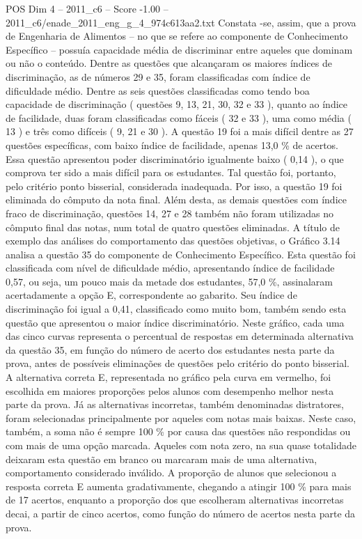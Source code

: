\begin{textsample}{POS Dim 4 – 2011\_c6 – Score -1.00 – 2011\_c6/enade\_2011\_eng\_g\_4\_974c613aa2.txt}
Constata -se, assim, que a prova de Engenharia de Alimentos – no que se refere ao componente de Conhecimento Específico – possuía capacidade média de discriminar entre aqueles que dominam ou não o conteúdo.
Dentre as questões que alcançaram os maiores índices de discriminação, as de números 29 e 35, foram classificadas com índice de dificuldade médio.
Dentre as seis questões classificadas como tendo boa capacidade de discriminação ( questões 9, 13, 21, 30, 32 e 33 ), quanto ao índice de facilidade, duas foram classificadas como fáceis ( 32 e 33 ), uma como média ( 13 ) e três como difíceis ( 9, 21 e 30 ).
A questão 19 foi a mais difícil dentre as 27 questões específicas, com baixo índice de facilidade, apenas 13,0 \% de acertos.
Essa questão apresentou poder discriminatório igualmente baixo ( 0,14 ), o que comprova ter sido a mais difícil para os estudantes.
Tal questão foi, portanto, pelo critério ponto bisserial, considerada inadequada.
Por isso, a questão 19 foi eliminada do cômputo da nota final.
Além desta, as demais questões com índice fraco de discriminação, questões 14, 27 e 28 também não foram utilizadas no cômputo final das notas, num total de quatro questões eliminadas.
A título de exemplo das análises do comportamento das questões objetivas, o Gráfico 3.14 analisa a questão 35 do componente de Conhecimento Específico.
Esta questão foi classificada com nível de dificuldade médio, apresentando índice de facilidade 0,57, ou seja, um pouco mais da metade dos estudantes, 57,0 \%, assinalaram acertadamente a opção E, correspondente ao gabarito.
Seu índice de discriminação foi igual a 0,41, classificado como muito bom, também sendo esta questão que apresentou o maior índice discriminatório.
Neste gráfico, cada uma das cinco curvas representa o percentual de respostas em determinada alternativa da questão 35, em função do número de acerto dos estudantes nesta parte da prova, antes de possíveis eliminações de questões pelo critério do ponto bisserial.
A alternativa correta E, representada no gráfico pela curva em vermelho, foi escolhida em maiores proporções pelos alunos com desempenho melhor nesta parte da prova.
Já as alternativas incorretas, também denominadas distratores, foram selecionadas principalmente por aqueles com notas mais baixas.
Neste caso, também, a soma não é sempre 100 \% por causa das questões não respondidas ou com mais de uma opção marcada.
Aqueles com nota zero, na sua quase totalidade deixaram esta questão em branco ou marcaram mais de uma alternativa, comportamento considerado inválido.
A proporção de alunos que selecionou a resposta correta E aumenta gradativamente, chegando a atingir 100 \% para mais de 17 acertos, enquanto a proporção dos que escolheram alternativas incorretas decai, a partir de cinco acertos, como função do número de acertos nesta parte da prova.

\end{textsample}
